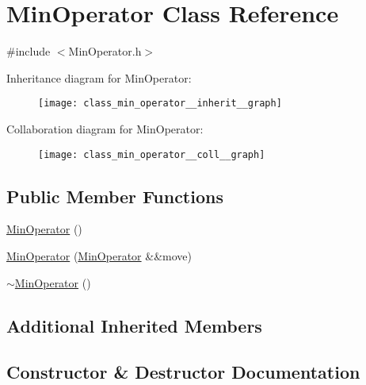 \hypertarget{class_min_operator}{}\section{Min\+Operator Class Reference}
\label{class_min_operator}


{\ttfamily \#include $<$Min\+Operator.\+h$>$}



Inheritance diagram for Min\+Operator\+:
\nopagebreak
\begin{figure}[H]
\begin{center}
\leavevmode
\texttt{[image: class\_min\_operator\_\_inherit\_\_graph]}
\end{center}
\end{figure}


Collaboration diagram for Min\+Operator\+:
\nopagebreak
\begin{figure}[H]
\begin{center}
\leavevmode
\texttt{[image: class\_min\_operator\_\_coll\_\_graph]}
\end{center}
\end{figure}
\subsection*{Public Member Functions}
\begin{DoxyCompactItemize}
\item 
\mbox{\hyperlink{class_min_operator_a44913498416213c62b27570dcf9c4b22}{Min\+Operator}} ()
\item 
\mbox{\hyperlink{class_min_operator_ab4a571ca005e5dc41a952a6a0bbf22a5}{Min\+Operator}} (\mbox{\hyperlink{class_min_operator}{Min\+Operator}} \&\&move)
\item 
\mbox{\hyperlink{class_min_operator_a8e4a21d4ff6ae49893bb717a18c1c1ac}{$\sim$\+Min\+Operator}} ()
\end{DoxyCompactItemize}
\subsection*{Additional Inherited Members}


\subsection{Constructor \& Destructor Documentation}
\mbox{\label{class_min_operator_a44913498416213c62b27570dcf9c4b22}} 
